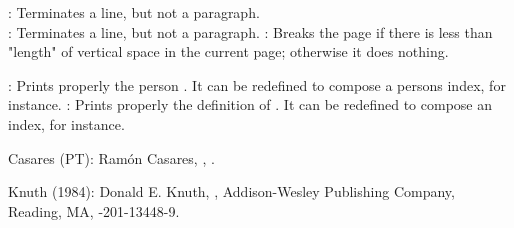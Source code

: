 \command\newline: Terminates a line, but not a paragraph.
\command\\: Terminates a line, but not a paragraph.
\command{}: Breaks the page if there is
 less than "length" of vertical space in the current page;
 otherwise it does nothing.

\command{}: Prints properly the person .
 It can be redefined to compose a persons index, for instance.
\command{}: Prints properly
 the definition of .
 It can be redefined to compose an index, for instance.



\biblabel Casares (PT):
Ramón Casares,
,
.

\biblabel Knuth (1984):
Donald E. Knuth,
,
Addison-Wesley Publishing Company, Reading, MA,
-201-13448-9.





\bye
